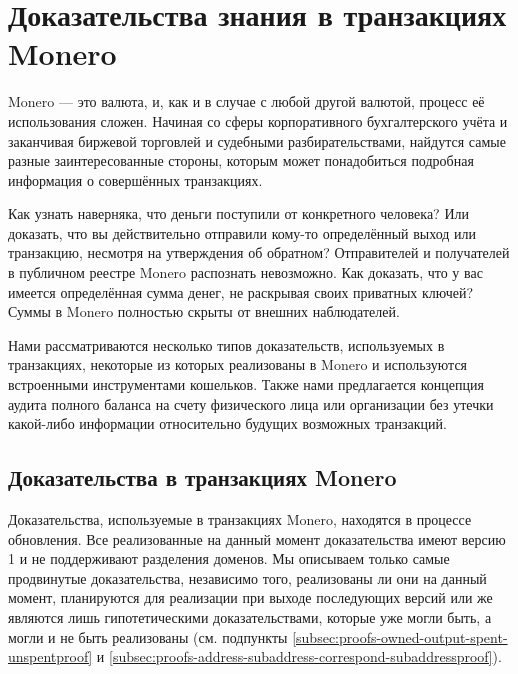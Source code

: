 \chapter{Доказательства знания в транзакциях Monero}
\label{chapter:tx-knowledge-proofs}

\iffalse
https://github.com/monero-project/monero/pull/6329/files

https://monero.stackexchange.com/questions/8122/what-is-the-spendproofv1-or-outproofv1-in-the-details-of-a-sent-transa

https://monero.stackexchange.com/questions/9991/how-does-the-get-reserve-proof-command-work

https://github.com/monero-project/research-lab/issues/68
\fi

Monero — это валюта, и, как и в случае с любой другой валютой, процесс её использования сложен. Начиная со сферы корпоративного бухгалтерского учёта и заканчивая биржевой торговлей и судебными разбирательствами, найдутся самые разные заинтересованные сторо\-ны, которым может понадобиться подробная информация о совершённых транзакциях.

Как узнать наверняка, что деньги поступили от конкретного человека? Или доказать, что вы действительно отправили кому-то определённый выход или транзакцию, несмотря на утверждения об обратном? Отправителей и получателей в публичном реестре Monero распо\-знать невозможно. Как доказать, что у вас имеется определённая сумма денег, не раскрывая своих приватных ключей? Суммы в Monero полностью скрыты от внешних наблюдателей.

Нами рассматриваются несколько типов доказательств, используемых в транзакциях, некото\-рые из которых реализованы в Monero и используются встроенными инструментами кошель\-ков. Также нами предлагается концепция аудита полного баланса на счету физического лица или организации без утечки какой-либо информации относительно будущих возможных транзакций.



\section{Доказательства в транзакциях Monero}
\label{sec:proofs-monero-proofs}

Доказательства, используемые в транзакциях Monero, находятся в процессе обновления\cite{sarang-txproofs-updates-issue}. Все реализованные на данный момент доказательства имеют версию 1 и не поддерживают разделения доменов. Мы описываем только самые продвинутые доказательства, независимо того, реализованы ли они на данный момент, планируются для реализации при выходе после\-дующих версий \cite{sarang-txproofs-v2-update-pr} или же являются лишь гипотетическими доказательствами, которые уже могли быть, а могли и не быть реализованы (см. подпункты \ref{subsec:proofs-owned-output-spent-unspentproof} \cite{unspent-proof-issue-68} и \ref{subsec:proofs-address-subaddress-correspond-subaddressproof}).


